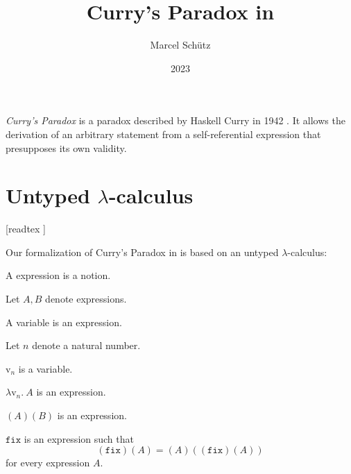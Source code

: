 \documentclass{stex}
\title{Curry's Paradox in \Naproche}
\author{Marcel Schütz}
\date{2023}
\newcommand{\var}[1]{\mathrm{v}_{#1}}
\newcommand{\abs}[2]{\lambda\var{#1}.\ #2}
\newcommand{\app}[2]{(#1)(#2)}
\newcommand{\fix}{\mathtt{fix}}
\begin{document}
\maketitle

\noindent \emph{Curry's Paradox} is a paradox described by Haskell Curry in 1942 \cite{Curry1942}.
It allows the derivation of an arbitrary statement from a self-referential expression that presupposes its own validity.

\section*{Untyped $\lambda$-calculus}

\begin{forthel}
  [readtex ]
\end{forthel}

\noindent Our formalization of Curry's Paradox in \Naproche is based on an untyped $\lambda$-calculus:

\begin{fsignature*}
  A expression is a notion.
\end{fsignature*}

Let $A, B$ denote expressions.

\begin{fsignature*}
  A variable is an expression.
\end{fsignature*}

Let $n$ denote a natural number.

\begin{fsignature*}
  $\var{n}$ is a variable.
\end{fsignature*}

\begin{fsignature*}[label=abstraction,title=Abstraction]
  $\abs{n}{A}$ is an expression.
\end{fsignature*}

\begin{fsignature*}[label=application,title=Application]
  $\app{A}{B}$ is an expression.
\end{fsignature*}

\begin{fsignature*}[label=fixed_point_combinator,title=Fixed-point combinator]
  $\fix$ is an expression such that
  \[\app{\fix}{A} = \app{A}{\app{\fix}{A}}\]
  for every expression $A$.
\end{fsignature*}
\end{document}
